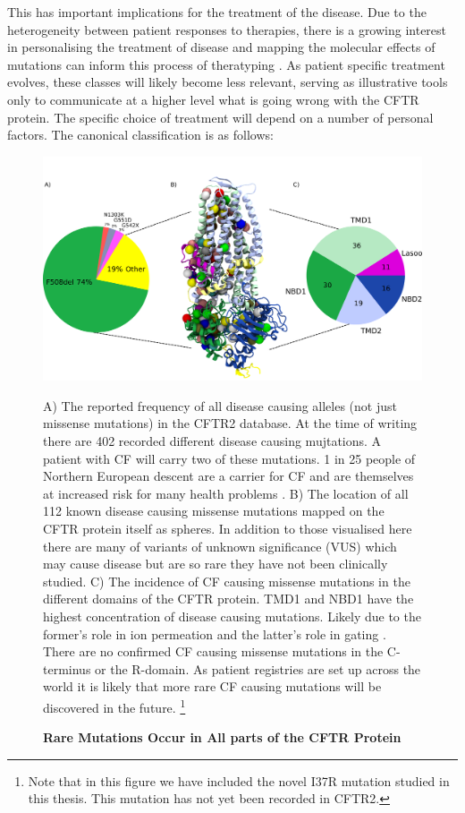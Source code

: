 This has important implications for the treatment of the disease. Due to the heterogeneity between patient responses to therapies, there is a growing interest in personalising the treatment of disease and mapping the molecular effects of mutations can inform this process of theratyping \cite{crawford2018,sette2021}. As patient specific treatment evolves, these classes will likely become less relevant, serving as illustrative tools only to communicate at a higher level what is going wrong with the CFTR protein. The specific choice of treatment will depend on a number of personal factors. The canonical classification is as follows:

\begin{figure}
	\begin{center}
	\includegraphics[width=\textwidth]{figures/alleles_pie_chart.pdf}
	\end{center}
	\captionsetup{singlelinecheck = false, justification=raggedright}
	\caption[Rare Mutations Occur in Across the CFTR Protein] {\textbf{Rare Mutations Occur in All parts of the CFTR Protein}}{A) The reported frequency of all disease causing alleles (not just missense mutations) in the CFTR2 database. At the time of writing there are 402 recorded different disease causing mujtations. A patient with CF will carry two of these mutations. 1 in 25 people of Northern European descent are a carrier for CF and are themselves at increased risk for many health problems \cite{ioannou2014, miller2020}. B) The location of all 112 known disease causing missense mutations mapped on the CFTR protein itself as spheres. In addition to those visualised here there are many of variants of unknown significance (VUS) which may cause disease but are so rare they have not been clinically studied. C) The incidence of CF causing missense mutations in the different domains of the CFTR protein. TMD1 and NBD1 have the highest concentration of disease causing mutations. Likely due to the former's role in ion permeation and the latter's role in gating \cite{cftr2}}. There are no confirmed CF causing missense mutations in the C-terminus or the R-domain. As patient registries are set up across the world it is likely that more rare CF causing mutations will be discovered in the future. \footnote{Note that in this figure we have included the novel I37R mutation studied in this thesis. This mutation has not yet been recorded in CFTR2.} 
	\label{CFTR_mutations_pie_chart}
\end{figure}


